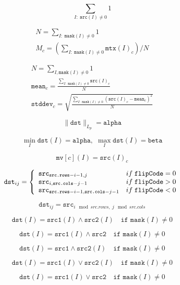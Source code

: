\documentclass{article}
\begin{document}
\[\sum _{I: \; \texttt{src} (I) \ne0 } 1\]
\pagebreak

\[\begin{array}{l} N = \sum _{I: \; \texttt{mask} (I) \ne 0} 1 \\ M_c = \left ( \sum _{I: \; \texttt{mask} (I) \ne 0}{ \texttt{mtx} (I)_c} \right )/N \end{array}\]
\pagebreak

\[\begin{array}{l} N = \sum _{I, \texttt{mask} (I) \ne 0} 1 \\ \texttt{mean} _c = \frac{\sum_{ I: \; \texttt{mask}(I) \ne 0} \texttt{src} (I)_c}{N} \\ \texttt{stddev} _c = \sqrt{\frac{\sum_{ I: \; \texttt{mask}(I) \ne 0} \left ( \texttt{src} (I)_c - \texttt{mean} _c \right )^2}{N}} \end{array}\]
\pagebreak

\[\| \texttt{dst} \| _{L_p}= \texttt{alpha}\]
\pagebreak

\[\min _I \texttt{dst} (I)= \texttt{alpha} , \, \, \max _I \texttt{dst} (I)= \texttt{beta}\]
\pagebreak

\[\texttt{mv} [c](I) = \texttt{src} (I)_c\]
\pagebreak

\[\texttt{dst} _{ij} = \left\{ \begin{array}{l l} \texttt{src} _{\texttt{src.rows}-i-1,j} & if\; \texttt{flipCode} = 0 \\ \texttt{src} _{i, \texttt{src.cols} -j-1} & if\; \texttt{flipCode} > 0 \\ \texttt{src} _{ \texttt{src.rows} -i-1, \texttt{src.cols} -j-1} & if\; \texttt{flipCode} < 0 \\ \end{array} \right.\]
\pagebreak

\[\texttt{dst} _{ij}= \texttt{src} _{i\mod src.rows, \; j\mod src.cols }\]
\pagebreak

\[\texttt{dst} (I) = \texttt{src1} (I) \wedge \texttt{src2} (I) \quad \texttt{if mask} (I) \ne0\]
\pagebreak

\[\texttt{dst} (I) = \texttt{src1} (I) \wedge \texttt{src2} \quad \texttt{if mask} (I) \ne0\]
\pagebreak

\[\texttt{dst} (I) = \texttt{src1} \wedge \texttt{src2} (I) \quad \texttt{if mask} (I) \ne0\]
\pagebreak

\[\texttt{dst} (I) = \texttt{src1} (I) \vee \texttt{src2} (I) \quad \texttt{if mask} (I) \ne0\]
\pagebreak

\[\texttt{dst} (I) = \texttt{src1} (I) \vee \texttt{src2} \quad \texttt{if mask} (I) \ne0\]
\pagebreak
\end{document}
